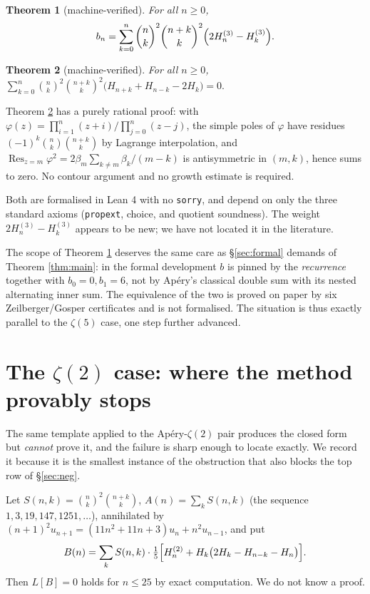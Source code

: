 \documentclass[11pt,a4paper]{amsart}
\theoremstyle{plain}
\newtheorem{theorem}{Theorem}[section]
\theoremstyle{definition}
\theoremstyle{remark}
\DeclareMathOperator{\Res}{Res}
\begin{document}
\begin{theorem}[machine-verified]\label{thm:z3}
For all $n\ge0$,
\[
  b_n=\sum_{k=0}^{n}\binom nk^2\binom{n+k}k^2\Bigl(2H^{(3)}_n-H^{(3)}_k\Bigr).
\]
\end{theorem}

\begin{theorem}[machine-verified]\label{thm:V}
For all $n\ge0$,
$\displaystyle\sum_{k=0}^{n}\binom nk^2\binom{n+k}k^2\bigl(H_{n+k}+H_{n-k}-2H_k\bigr)=0 .$
\end{theorem}

Theorem \ref{thm:V} has a purely rational proof: with
$\varphi(z)=\prod_{i=1}^n(z+i)\big/\prod_{j=0}^n(z-j)$, the simple poles of $\varphi$ have
residues $(-1)^k\binom nk\binom{n+k}k$ by Lagrange interpolation, and
$\Res_{z=m}\varphi^2=2\beta_m\sum_{k\ne m}\beta_k/(m-k)$ is antisymmetric in $(m,k)$, hence sums
to zero. No contour argument and no growth estimate is required.

Both are formalised in Lean 4 with no \texttt{sorry}, and depend on only the three
standard axioms (\texttt{propext}, choice, and quotient soundness). The weight
$2H^{(3)}_n-H^{(3)}_k$ appears to be new; we have not located it in the literature.

The scope of Theorem \ref{thm:z3} deserves the same care as \S\ref{sec:formal} demands of
Theorem \ref{thm:main}: in the formal development $b$ is pinned by the \emph{recurrence}
together with $b_0=0,b_1=6$, not by Ap\'ery's classical double sum with its nested alternating
inner sum. The equivalence of the two is proved on paper by six Zeilberger/Gosper certificates
and is not formalised. The situation is thus exactly parallel to the $\zeta(5)$ case, one step
further advanced.

\section{The $\zeta(2)$ case: where the method provably stops}\label{sec:z2}

The same template applied to the Ap\'ery-$\zeta(2)$ pair produces the closed form but
\emph{cannot} prove it, and the failure is sharp enough to locate exactly. We record it because
it is the smallest instance of the obstruction that also blocks the top row of
\S\ref{sec:neg}.

Let $S(n,k)=\binom nk^2\binom{n+k}k$, $A(n)=\sum_kS(n,k)$ (the sequence
$1,3,19,147,1251,\dots$), annihilated by $(n+1)^2u_{n+1}=(11n^2+11n+3)u_n+n^2u_{n-1}$, and put
\begin{equation}\label{eq:z2}
  B(n)=\sum_{k}S(n,k)\cdot\tfrac15\Bigl[H^{(2)}_n+H_k\bigl(2H_k-H_{n-k}-H_n\bigr)\Bigr].
\end{equation}
Then $L[B]=0$ holds for $n\le25$ by exact computation. We do not know a proof.
\end{document}
